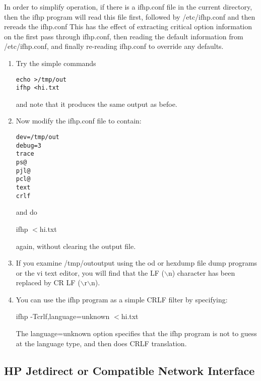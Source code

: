 \documentclass[a4paper]{article}
\begin{document}
In order to simplify operation,
if there is a
{\ttfamily ifhp.conf} file in the current directory,
then the
{\ttfamily ifhp} program will read this file first,
followed by
{\ttfamily /etc/ifhp.conf}
and then rereads the
{\ttfamily ifhp.conf}
This has the effect of extracting critical option information on the
first pass through
{\ttfamily ifhp.conf},
then reading the default information from
{\ttfamily /etc/ifhp.conf},
and finally re-reading
{\ttfamily ifhp.conf} to override any defaults. 
\begin{enumerate}
\item Try the simple commands
\begin{tscreen}
\begin{verbatim}
echo >/tmp/out
ifhp <hi.txt
\end{verbatim}
\end{tscreen}

and note that it produces the same output as befoe.
\item Now modify the
{\ttfamily ifhp.conf} file to contain:
\begin{tscreen}
\begin{verbatim}
dev=/tmp/out
debug=3
trace
ps@ 
pjl@
pcl@
text
crlf
\end{verbatim}
\end{tscreen}

and do
\begin{tscreen}
ifhp $<$hi.txt
\end{tscreen}

again, without clearing the output file.
\item If you examine 
{\ttfamily /tmp/out}output using the 
{\ttfamily od} or {\ttfamily hexdump} file dump programs or the
{\ttfamily vi} text editor,
you will find that the LF
({\ttfamily $\backslash$n}) character has been replaced by
CR LF ({\ttfamily $\backslash$r$\backslash$n}).
\item You can use the
{\ttfamily ifhp}
program as a simple CRLF filter by specifying:
\begin{tscreen}
ifhp -Tcrlf,language=unknown $<$hi.txt
\end{tscreen}

The
{\ttfamily language=unknown} option specifies that the ifhp
program is not to guess at the language type,
and then does CRLF translation.

\end{enumerate}



\subsection{HP Jetdirect or Compatible Network Interface}
\end{document}
